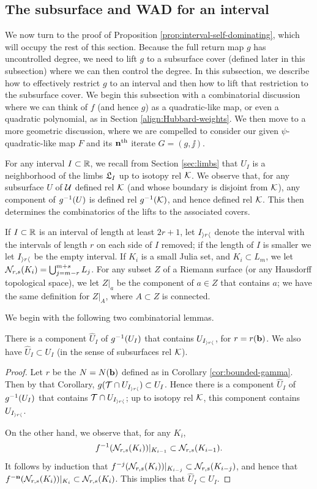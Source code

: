 \subsection{The subsurface and WAD for an interval} \label{align:interval}
We now turn to the proof of Proposition \ref{prop:interval-self-dominating}, which will occupy the rest of this section.
Because the full return map $g$ has uncontrolled degree, 
we need to lift $g$ to a subsurface cover (defined later in this subsection) where we can then control the degree. 
In this subsection, 
we describe how to effectively restrict $g$ to an interval and then how to lift that restriction to the subsurface cover. 
We begin this subsection with a combinatorial discussion where we can think of $f$ (and hence $g$) as a quadratic-like map, or even a quadratic polynomial, as in Section \ref{align:Hubbard-weights}. We then move to a more geometric discussion, where we are compelled to consider our given $\psi$-quadratic-like map $F$ and its $\mathbf{n}^{\text{th}}$ iterate $G = (g, \jj)$. 

For any interval $I\subset \mathbb R$, we recall from Section \ref{sec:limbs}
that $U_I$ is a neighborhood of the limbs $\mathfrak{L}_I$ up to isotopy rel $\mathcal K$. 
We observe that,
for any subsurface $U$ of $\mathcal U$ defined rel $\mathcal K$ (and whose boundary is disjoint from $\mathcal K$), 
any component of $g^{-1}(U)$ is defined rel $g^{-1}(\mathcal K)$, and hence defined rel $\mathcal K$. 
This then determines the combinatorics of the lifts to the associated covers. 

If $I\subset \mathbb R$ is an interval of  length at least $2r+1$, let $I_{\left>r\right<}$ denote the interval with the intervals of length $r$ on each side of $I$ removed; 
if the length of $I$ is smaller we let $I_{\left>r\right<}$ be the empty interval.
If $K_i$ is a small Julia set, and $K_i \subset L_m$, we let $\mathcal N_{r, s}(K_i) = \bigcup_{j=m-r}^{m+s} L_j$. 
For any subset $Z$ of a Riemann surface (or any Hausdorff topological space),
we let $Z|_a$ be the component of $a \in Z$ that contains $a$;
we have the same definition for $Z|_A$, where $A\subset Z$ is connected. 

We begin with the following two combinatorial lemmas.
\begin{lemma}
There is a component $\hat U_I$ of $g^{-1}(U_I)$ that contains $U_{I_{\left>r\right<}}$, for $r = r(\mathbf b )$. 
We also have $\hat U_I \subset U_I$ (in the sense of subsurfaces rel $\mathcal K$). 
\end{lemma}

\begin{proof}
Let $r$ be the $N=N(\mathbf b)$ defined as in Corollary \ref{cor:bounded-gamma}.
Then by that Corollary,
$g(\mathcal T \cap U_{I_{\left>r\right<}}) \subset U_I$. 
Hence there is a component $\hat U_I$ of $g^{-1}(U_I)$ that contains $\mathcal T \cap U_{I_{\left>r\right<}}$; 
up to isotopy rel $\mathcal K$, this component contains $U_{I_{\left>r\right<}}$. 

On the other hand, we observe that, for any $K_i$,
$$ f^{-1}(\mathcal N_{r, s}(K_i))|_{K_{i-1}} \subset \mathcal N_{r, s}(K_{i-1}).$$
It follows by induction that $f^{-j}(\mathcal N_{r, s}(K_i))|_{K_{i-j}} \subset \mathcal N_{r, s}(K_{i-j})$, 
and hence that $f^{-\mathbf{n}}(\mathcal N_{r, s}(K_i))|_{K_i} \subset \mathcal N_{r, s}(K_i)$. 
This implies that $\hat U_I \subset U_I$. 
\end{proof}

